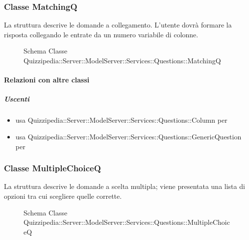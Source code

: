 \subsubsection{Classe MatchingQ}
La struttura descrive le domande a collegamento. L'utente dovrà formare la risposta collegando le entrate da un numero variabile di colonne.
\begin{figure}[H]
\centering
\noindent{}
\caption[Schema Classe MatchingQ]{Schema Classe Quizzipedia::Server::ModelServer::Services::Questions::MatchingQ}
\end{figure}
\paragraph{Relazioni con altre classi}
\subparagraph{Uscenti}
\begin{itemize}
\item usa Quizzipedia::Server::ModelServer::Services::Questions::Column per 
\item usa Quizzipedia::Server::ModelServer::Services::Questions::GenericQuestion per 
\end{itemize}
\subsubsection{Classe MultipleChoiceQ}
La struttura descrive le domande a scelta multipla; viene presentata una lista di opzioni tra cui scegliere quelle corrette.
\begin{figure}[H]
\centering
\noindent{}
\caption[Schema Classe MultipleChoiceQ]{Schema Classe Quizzipedia::Server::ModelServer::Services::Questions::MultipleChoiceQ}
\end{figure}
